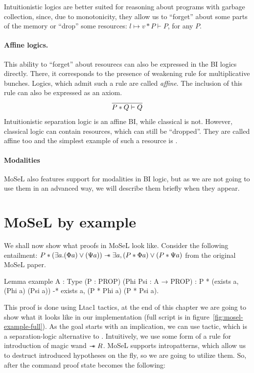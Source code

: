 Intuitionistic logics are better suited for reasoning about programs with garbage collection, since, due to monotonicity, they allow us to ``forget''  about some parts of the memory or ``drop'' some resources: \(l \mapsto v \ast P \vdash P\), for any \(P\).

\paragraph{Affine logics.}
This ability to ``forget'' about resourecs can also be expressed in the BI logics directly.
There, it corresponds to the presence of weakening rule for multiplicative bunches.
Logics, which admit such a rule are called \emph{affine}.
The inclusion of this rule can also be expressed as an axiom.
\[\infer{P \ast Q\vdash Q}{}\]
Intuitionistic separation logic is an affine BI, while classical is not.
However, classical logic can contain resources, which can still be ``dropped''.
They are called affine too and the simplest example of such a resource is \emp.

\paragraph{Modalities}
MoSeL also features support for modalities in BI logic, but as we are not going to use them in an advanced way, we will describe them briefly when they appear.

\section{MoSeL by example}
\label{sec:mosel-example}

We shall now show what proofs in MoSeL look like.
Consider the following entailment:
\(P \ast (\exists a. (\Phi a) \vee (\Psi a)) \mathrel{-\mkern-6mu*} \exists a, (P \ast \Phi a) \vee (P \ast \Psi a)\) from the original MoSeL paper\cite{krebbersMoSeLGeneralExtensible2018}.

\begin{coq}
Lemma example {A : Type} (P : PROP) (Phi Psi : A → PROP) :
  P * (exists a, (Phi a) \/ (Psi a)) -* exists a, (P * Phi a) \/ (P * Psi a).
\end{coq}

This proof is done using Ltac1 tactics, at the end of this chapter we are going to show what it looks like in our implementation (full script is in figure~\ref{fig:mosel-example-full}).
As the goal starts with an implication, we can use  tactic, which is a separation-logic alternative to .
Intuitively, we use some form of a rule for introduction of magic wand \(\mathrel{-\mkern-6mu*} R\).
MoSeL supports intropatterns, which allow us to destruct introduced hypotheses on the fly, so we are going to utilize them.
So, after the command  proof state becomes the following:

